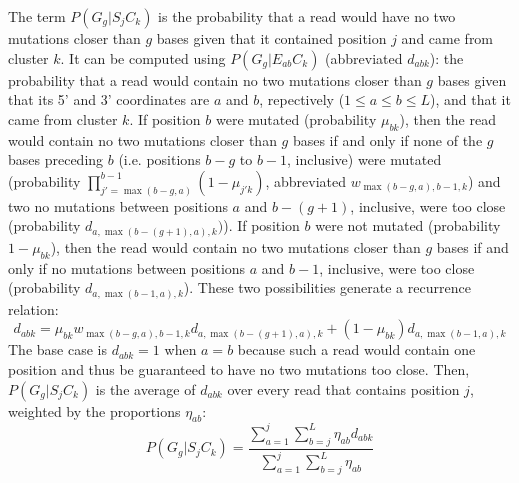 \documentclass[main.tex]{subfiles}
\begin{document}
The term $P(G_g | S_j C_k)$ is the probability that a read would have no two mutations closer than $g$ bases given that it contained position $j$ and came from cluster $k$.
It can be computed using $P(G_g | E_{ab} C_k)$ (abbreviated $d_{abk}$): the probability that a read would contain no two mutations closer than $g$ bases given that its 5' and 3' coordinates are $a$ and $b$, repectively ($1 \le a \le b \le L$), and that it came from cluster $k$.
If position $b$ were mutated (probability $\mu_{bk}$), then the read would contain no two mutations closer than $g$ bases if and only if none of the $g$ bases preceding $b$ (i.e. positions $b - g$ to $b - 1$, inclusive) were mutated (probability $\prod_{j'=\max(b-g, a)}^{b-1}(1 - \mu_{j'k})$, abbreviated $w_{\max(b-g, a),b-1,k}$) and two no mutations between positions $a$ and $b - (g + 1)$, inclusive, were too close (probability $d_{a,\max(b-(g+1), a),k})$).
If position $b$ were not mutated (probability $1 - \mu_{bk}$), then the read would contain no two mutations closer than $g$ bases if and only if no mutations between positions $a$ and $b - 1$, inclusive, were too close (probability $d_{a,\max(b-1,a),k}$).
These two possibilities generate a recurrence relation:
$$d_{abk} = \mu_{bk} w_{\max(b-g, a),b-1,k} d_{a,\max(b-(g+1), a),k} + (1 - \mu_{bk}) d_{a,\max(b-1,a),k}$$
The base case is $d_{abk} = 1$ when $a = b$ because such a read would contain one position and thus be guaranteed to have no two mutations too close.
Then, $P(G_g | S_j C_k)$ is the average of $d_{abk}$ over every read that contains position $j$, weighted by the proportions $\eta_{ab}$:
$$P(G_g | S_j C_k) = \frac{\sum_{a=1}^{j}\sum_{b=j}^{L}\eta_{ab}d_{abk}}{\sum_{a=1}^{j}\sum_{b=j}^{L}\eta_{ab}}$$
\end{document}
